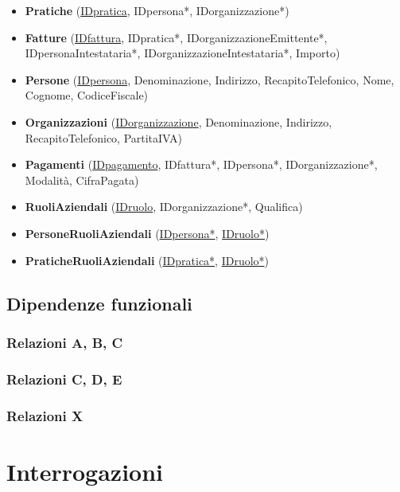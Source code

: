 \documentclass[a4paper,12pt]{article}
\begin{document}
\begin{itemize}
\item \textbf{Pratiche} (\underline{IDpratica}, IDpersona*, IDorganizzazione*)

\item \textbf{Fatture} (\underline{IDfattura}, IDpratica*, IDorganizzazioneEmittente*, IDpersonaIntestataria*, IDorganizzazioneIntestataria*, Importo)

\item \textbf{Persone} (\underline{IDpersona}, Denominazione, Indirizzo, RecapitoTelefonico, Nome, Cognome, CodiceFiscale)

\item \textbf{Organizzazioni} (\underline{IDorganizzazione}, Denominazione, Indirizzo, RecapitoTelefonico, PartitaIVA)

\item \textbf{Pagamenti} (\underline{IDpagamento}, IDfattura*, IDpersona*, IDorganizzazione*, Modalità, CifraPagata)

\item \textbf{RuoliAziendali} (\underline{IDruolo}, IDorganizzazione*, Qualifica)

\item \textbf{PersoneRuoliAziendali} (\underline{IDpersona*}, \underline{IDruolo*})

\item \textbf{PraticheRuoliAziendali} (\underline{IDpratica*}, \underline{IDruolo*})
\end{itemize}


 \subsection{ Dipendenze funzionali }

 \subsubsection{ Relazioni A, B, C }

 \subsubsection{ Relazioni C, D, E }

 \subsubsection{ Relazioni X }

 \section{ Interrogazioni }
\end{document}
